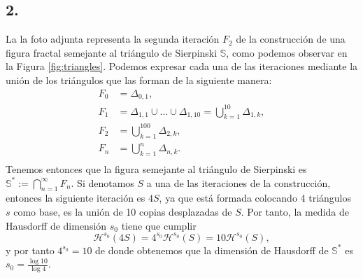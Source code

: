 \documentclass[11pt,a4paper]{article}
\begin{document}
\newpage
\subsection*{2.}


La la foto adjunta representa la segunda iteración $ F_2 $ de la construcción de una figura fractal semejante al triángulo de Sierpinski $ \mathbb S $, como podemos observar en la Figura \ref{fig:triangles}. Podemos expresar cada una de las iteraciones mediante la unión de los triángulos que las forman de la siguiente manera:
\begin{align*}
  F_0 &= \Delta_{0,1}, \\ 
  F_1 &= \Delta_{1,1} \cup \dots \cup \Delta_{1,10} = \bigcup_{k=1}^{10} \Delta_{1, k}, \\
  F_2 &= \bigcup_{k=1}^{100} \Delta_{2, k}, \\
  F_n &= \bigcup_{k=1}^{n} \Delta_{n, k}. \\
\end{align*}
Tenemos entonces que la figura semejante al triángulo de Sierpinski es $ \mathbb S^* := \bigcap_{n=1}^\infty F_n $. Si denotamos $ S $ a una de las iteraciones de la construcción, entonces la siguiente iteración es $ 4S $, ya que está formada colocando 4 triángulos $ s $ como base, es la unión de 10 copias desplazadas de $ S $. Por tanto, la medida de Hausdorff de dimensión $ s_0 $ tiene que cumplir
$$
  \mathcal H^{s_0} (4S) = 4^{s_0} \mathcal H^{s_0} (S) = 10 \mathcal H^{s_0} (S),
$$
y por tanto $ 4^{s_0} = 10 $ de donde obtenemos que la dimensión de Hausdorff de $ \mathbb S^* $ es $ s_0 = \frac{\log 10}{\log 4} $.
\end{document}
